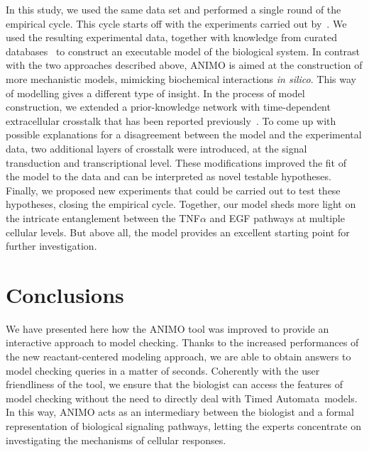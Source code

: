 \documentclass{bmcart}
\def\tas{Timed Automata}
\begin{document}
In this study, we used the same data set and performed a single round of the empirical cycle.
This cycle starts off with the experiments carried out by~\cite{pathway-compendium}. We used the
resulting experimental data, together with knowledge from curated databases~\cite{kegg,phosphosite}
to construct an executable model of the biological system.
In contrast with the two approaches described above, ANIMO is aimed at the construction of
more mechanistic models, mimicking biochemical interactions \emph{in silico}. This way of modelling
gives a different type of insight. In the process of model construction, we extended a
prior-knowledge network with time-dependent extracellular crosstalk that has been reported
previously~\cite{pathway-autocrine}. To come up with possible explanations for a disagreement
between the model and the experimental data, two additional layers of
crosstalk were introduced, at the signal transduction and transcriptional level. These modifications 
improved the fit of the model to the data and can be interpreted as novel testable hypotheses.
Finally, we proposed new experiments that could be carried out to test these hypotheses, closing the empirical cycle. 
Together, our model sheds more light on the intricate
entanglement between the TNF$\alpha$ and EGF pathways at multiple cellular levels.
But above all,  the model provides an excellent starting point for further investigation.



\section*{Conclusions}
We have presented here how the ANIMO tool 
was improved to provide an interactive approach to model checking.
Thanks to the increased performances of the new reactant-centered modeling approach,
we are able to obtain answers to model checking queries in a matter of seconds.
Coherently with the user friendliness of the tool, we ensure that the biologist can access the features
of model checking without the need to directly deal with \tas\ models.
In this way, ANIMO acts as an intermediary between the biologist and a formal
representation of biological signaling pathways, letting the experts concentrate
on investigating the mechanisms of cellular responses.
\end{document}
